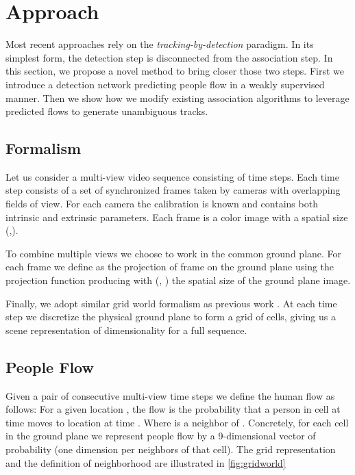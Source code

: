 \documentclass[10pt,twocolumn,letterpaper]{article}
\begin{document}
\section{Approach}\label{sec:approach}
 Most recent approaches rely on the \textit{tracking-by-detection} paradigm. 
In its simplest form, the detection step is disconnected from the association step.
In this section, we propose a novel method to bring closer those two steps. First we introduce a detection network predicting people flow in a weakly supervised manner. 
Then we show how we modify existing association algorithms to leverage predicted flows to generate unambiguous tracks. 


\subsection{Formalism}
\label{sec:formalism}

Let us consider a multi-view video sequence  consisting of  time steps.
Each time step  consists of a set of synchronized frames taken by  cameras with overlapping fields of view.
For each camera the calibration  is known and contains both intrinsic and extrinsic parameters.
Each frame   is a color image with a spatial size (,).

To combine multiple views we choose to work in the common ground plane. For each frame we define  as the  projection of frame  
on the ground plane using the projection function  producing  with (, )  the spatial size of the ground plane image. 


Finally, we adopt similar grid world formalism as previous work \cite{Berclaz11}. At each time step  we discretize the physical ground plane to form a grid of  cells, 
giving us a scene representation of dimensionality  for a full sequence.



\subsection{People Flow}
\label{sec:peopleflow}

Given a pair of consecutive multi-view time steps we define the human flow  as follows: For a given location , the flow  
is the probability that a person in cell  at time  moves to location  at time . Where  is a neighbor of . 
Concretely, for each cell in the ground plane we represent people flow by a 9-dimensional vector of probability (one dimension per neighbors of that cell). 
The grid representation and the definition  of neighborhood are illustrated in \cref{fig:gridworld}
\end{document}

